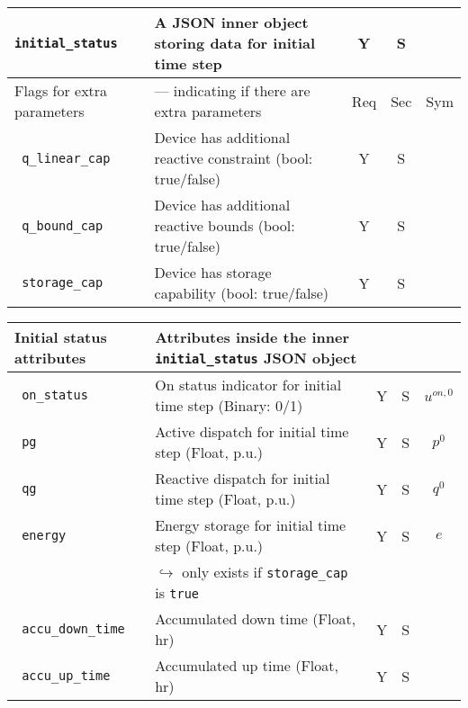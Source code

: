 \documentclass{article}
\begin{document}
\begin{center}
\begin{tabular}{ l | l | c | c | c |}
  {\tt initial\_status} & A JSON inner object storing data for initial time step & Y & S &  \\
   \hline
   Flags for extra parameters & --- indicating if there are extra parameters & Req & Sec & Sym\\
   \hline
     {\tt\color{red} q\_linear\_cap}      & Device has additional reactive constraint (bool: true/false) & Y & S & \\
  {\tt\color{red} q\_bound\_cap}       & Device has additional reactive bounds (bool: true/false) & Y & S & \\
  {\tt\color{red} storage\_cap}       & Device has storage capability (bool: true/false) & Y & S & \\
  \hline   
\end{tabular}
\end{center}

\begin{center}
\small
\begin{tabular}{ l | l | c | c | c |}
\hline
  Initial status attributes &  Attributes inside the inner {\tt initial\_status} JSON object &  &  & \\
  \hline    
  {\tt\color{red} on\_status} & On status indicator for initial time step (Binary: 0/1) & Y & S & $u^{on,0}$\\
  {\tt\color{red} pg} & Active dispatch for initial time step (Float, p.u.) & Y & S & $p^0$ \\
  {\tt\color{red} qg} & Reactive dispatch for initial time step (Float, p.u.)& Y & S & $q^0$ \\
  {\tt\color{red} energy} & Energy storage for initial time step (Float, p.u.)& Y & S & $e$\\  
                          & $\hookrightarrow$ only exists if \texttt{storage\_cap} is \texttt{true} & & & \\  
  {\tt\color{red} accu\_down\_time} & Accumulated down time (Float, hr) & Y & S & \\  
  {\tt\color{red} accu\_up\_time} & Accumulated up time (Float, hr) & Y & S & \\  
 \hline
\end{tabular}
\end{center}
\end{document}
